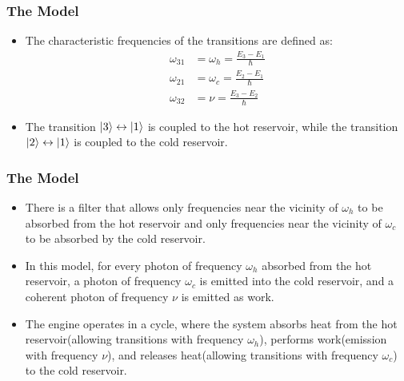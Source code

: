 \documentclass{beamer}
\begin{document}
    \begin{frame}
        \frametitle{The Model}
        \begin{itemize}
            \item The characteristic frequencies of the transitions are defined as:
            \begin{align*}
                \omega_{31} &= \omega_h = \frac{E_3 - E_1}{\hbar} \\
                \omega_{21} &= \omega_c = \frac{E_2 - E_1}{\hbar} \\ 
                \omega_{32} &= \nu = \frac{E_3 - E_2}{\hbar}
            \end{align*} \pause
            \item The transition $\ket{3} \leftrightarrow \ket{1}$ is coupled to the hot reservoir, while the transition $\ket{2} \leftrightarrow \ket{1}$ is coupled to the cold reservoir. 
        \end{itemize}
    \end{frame} 

    \begin{frame}
        \frametitle{The Model}
        \begin{itemize}
            \item There is a filter that allows only frequencies near the vicinity of $\omega_{h}$ to be absorbed from the hot reservoir and only frequencies near the vicinity of $\omega_{c}$ to be absorbed by the cold reservoir. \pause
            \item In this model, for every photon of frequency $\omega_{h}$ absorbed from the hot reservoir, a photon of frequency $\omega_{c}$ is emitted into the cold reservoir, and a coherent photon of frequency $\nu$ is emitted as work. \pause
            \item The engine operates in a cycle, where the system absorbs heat from the hot reservoir(allowing transitions with frequency $\omega_{h}$), performs work(emission with frequency $\nu$), and releases heat(allowing transitions with frequency $\omega_{c}$) to the cold reservoir.
        \end{itemize}
    \end{frame}
    
\end{document}
